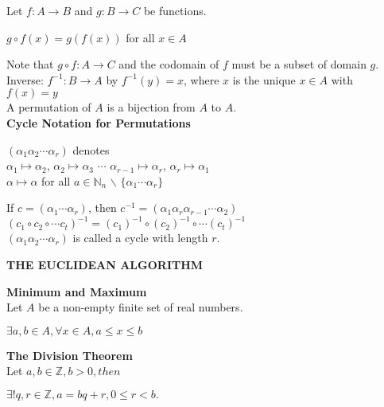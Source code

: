 \documentclass[a4paper]{article}
\begin{document}
\begin{multicols}{2}
\begin{framed}
	\noindent
	Let $f: A \rightarrow B$ and $g: B \rightarrow C$ be functions.
	\begin{center}
		$g \circ f(x) = g(f(x))$ for all $x \in A$
	\end{center}
	Note that $g \circ f: A \rightarrow C$ and the codomain of $f$ must be a subset of domain $g$.\\
	
	\noindent
	Inverse: $f^{-1}: B \rightarrow A$ by $f^{-1}(y) = x$, where $x$ is the unique $x \in A$ with $f(x) = y$\\
	
	\noindent
	A permutation of $A$ is a bijection from $A$ to $A$.\\
	
	\noindent
	\textbf{Cycle Notation for Permutations}
	\begin{center}
			$(\alpha_1\alpha_2\cdots\alpha_r)$ denotes\\
	$\alpha_1\mapsto\alpha_2$, $\alpha_2\mapsto\alpha_3$ $\cdots$ $\alpha_{r-1}\mapsto\alpha_r$, $\alpha_r\mapsto\alpha_1$\\
	$\alpha\mapsto\alpha$ for all $a \in \mathbb{N}_n$ $\backslash$ $\{\alpha_1 \cdots \alpha_r\}$
	\end{center}
	
	\noindent
	If $c = (\alpha_1\cdots\alpha_r)$, then $c^{-1} = (\alpha_1\alpha_r\alpha_{r-1}\cdots\alpha_2)$\\
	$(c_1 \circ c_2 \circ \cdots c_t)^{-1} = (c_1)^{-1} \circ (c_2)^{-1} \circ \cdots (c_t)^{-1}$\\
	
	\noindent
	$(\alpha_1\alpha_2\cdots\alpha_r)$ is called a cycle with length $r$.
\end{framed}



\newpage



\begin{framed}
	\begin{center}
		\textbf{\textsc{THE EUCLIDEAN ALGORITHM}}
	\end{center}
	\textbf{Minimum and Maximum}\\
	Let $A$ be a non-empty finite set of real numbers.
	\begin{center}
		$\exists a, b \in A, \forall x \in A, a \leq x \leq b$
	\end{center}
	
	\noindent
	\textbf{The Division Theorem}\\
	Let $a, b \in \mathbb{Z}, b > 0, then$
	\begin{center}
		$\exists ! q, r \in \mathbb{Z}, a = bq+r, 0 \leq r < b.$		
	\end{center}
	

\end{framed}
\end{multicols}
\end{document}
